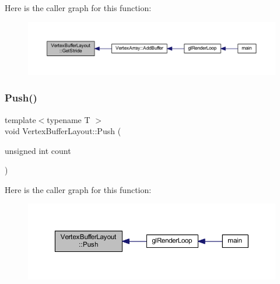 Here is the caller graph for this function\+:
\nopagebreak
\begin{figure}[H]
\begin{center}
\leavevmode
\includegraphics[width=350pt]{class_vertex_buffer_layout_aca33593016f0360720489d25b933ac4a_icgraph}
\end{center}
\end{figure}
\mbox{\label{class_vertex_buffer_layout_a7e1ef819bf5dc21d20bb38d9c6914aa5}} 
\subsubsection{\texorpdfstring{Push()}{Push()}\hspace{0.1cm}{\footnotesize\ttfamily [1/4]}}
{\footnotesize\ttfamily template$<$typename T $>$ \\
void Vertex\+Buffer\+Layout\+::\+Push (\begin{DoxyParamCaption}\item[{unsigned int}]{count }\end{DoxyParamCaption})\hspace{0.3cm}{\ttfamily [inline]}}

Here is the caller graph for this function\+:
\nopagebreak
\begin{figure}[H]
\begin{center}
\leavevmode
\includegraphics[width=350pt]{class_vertex_buffer_layout_a7e1ef819bf5dc21d20bb38d9c6914aa5_icgraph}
\end{center}
\end{figure}
\mbox{\label{class_vertex_buffer_layout_a0ac1e4373209bf1a2c5c3551f690724b}} 
